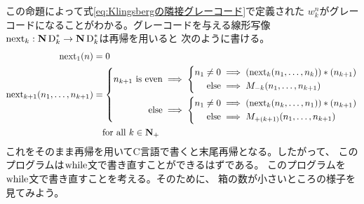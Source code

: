 	この命題によって式\eqref{eq:Klingsbergの隣接グレーコード}で定義された
	$w_k^n$がグレーコードになることがわかる。グレーコードを与える線形写像
	$\operatorname{next}_k:{\mathbf{N}}\operatorname{D}_k^*\to{\mathbf{N}}\operatorname{D}_k^*$は再帰を用いると
	次のように書ける。
	\begin{equation*}\begin{split} %
		\myop{next}_1(n) &= 0 \\
		\myop{next}_{k+1}(n_1,\dots,n_{k+1}) &= \left\{\begin{split}
			n_{k+1}\text{ is even} &\implies \left\{\begin{split}
				n_1\neq 0 &\implies (\myop{next}_k(n_1,\dots,n_k)) * (n_{k+1})\\
				\text{else} &\implies M_{-k}(n_1,\dots,n_{k+1}) \\
			\end{split}\right. \\ %
			\text{else} &\implies \left\{\begin{split}
				n_1\neq 0 &\implies (\myop{next}_k(n_k,\dots,n_1)) * (n_{k+1})\\
				\text{else} &\implies M_{+(k+1)}(n_1,\dots,n_{k+1}) \\
			\end{split}\right. \\ %
		\end{split}\right. \\ %
		&\quad\text{for all }k\in\sizen_+
	\end{split}\end{equation*} %
	これをそのまま再帰を用いてC言語で書くと末尾再帰となる。したがって、
	このプログラムは$\operatorname{while}$文で書き直すことができるはずである。
	このプログラムを$\operatorname{while}$文で書き直すことを考える。そのために、
	箱の数が小さいところの様子を見てみよう。

